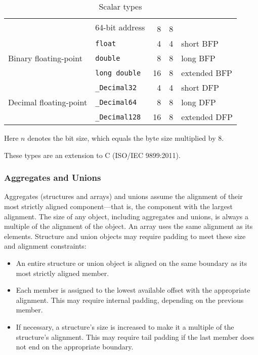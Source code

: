\documentclass[english,11pt,twoside,toc=bib,toc=idx]{scrreprt}
\newcommand{\ADDRBITS}{64}
\newcommand{\NBYTES}{8}
\newcommand{\ADDRBITS}{31}
\newcommand{\NBYTES}{4}
\newenvironment{DIFnomarkup}{}{} %
\begin{document}
\begin{table}
\begin{DIFnomarkup}
\begin{threeparttable}
\begin{tabularx}{\textwidth}{XlrrX}
      & \multirow{2}{\hsize}{\ADDRBITS{}-bit address} \\
      & \textit{any-type}\texttt{ (*) ()} & \NBYTES{} & \NBYTES{} \\
      \midrule
      \multirow{3}{\hsize}{Binary floating-point} &
      \texttt{float} & 4 & 4 & short BFP \\
      & \texttt{double} & 8 & 8 & long BFP \\
      & \texttt{long double} & 16 & 8 & extended BFP \\
      \midrule
      \multirow{3}{\hsize}{Decimal floating-point} &
      \texttt{\_Decimal32}\tnote{\dagger\dagger} & 4 & 4 & short DFP \\
      & \texttt{\_Decimal64}\tnote{\dagger\dagger} & 8 & 8 & long DFP \\
      & \texttt{\_Decimal128}\tnote{\dagger\dagger} & 16 & 8 & extended DFP \\
      \bottomrule
    \end{tabularx}
    \medskip
    \begin{tablenotes}
    \item [\dagger] Here $n$ denotes the bit size, which equals the byte
      size multiplied by 8.
    \item [\dagger\dagger] These types are an extension to C (ISO/IEC
      9899:2011).
    \end{tablenotes}
  \end{threeparttable}
  \end{DIFnomarkup}
  \caption{Scalar types}
  \label{tab:scalar}
\end{table}

\subsubsection{Aggregates and Unions}
Aggregates
(structures and arrays) and
unions assume the
alignment of their most strictly
aligned component---that is, the component with the largest alignment.
The size of any object, including
aggregates and unions, is always a multiple of the alignment of the
object.  An array uses the same alignment as its elements.  Structure and
union objects may require padding to meet these size and alignment
constraints:

\begin{itemize}
\item An entire structure or union object is aligned on the same
  boundary as its most strictly aligned member.
\item Each member is assigned to the lowest available offset with the
  appropriate alignment.  This may require internal
  padding, depending on the previous member.
\item If necessary, a structure's size is increased to make it a
  multiple of the structure's alignment.  This may require tail padding
  if the last member does not end on the appropriate boundary.
\end{itemize}
\end{document}

